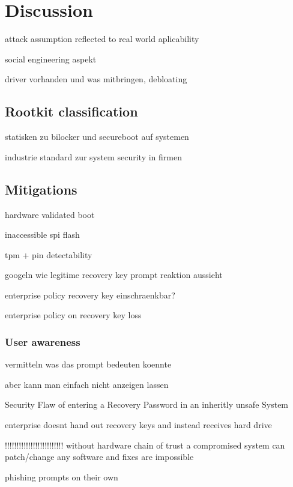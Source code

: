 
\chapter{Discussion}

attack assumption reflected to real world aplicability

social engineering aspekt

driver vorhanden und was mitbringen, debloating

\section{Rootkit classification}

statisken zu bilocker und secureboot auf systemen

industrie standard zur system security in firmen

\section{Mitigations}

hardware validated boot

inaccessible spi flash

tpm + pin detectability

googeln wie legitime recovery key prompt reaktion aussieht

enterprise policy recovery key einschraenkbar?

enterprise policy on recovery key loss


\subsection{User awareness}

vermitteln was das prompt bedeuten koennte

aber kann man einfach nicht anzeigen lassen

Security Flaw of entering a Recovery Password in an inheritly unsafe System

enterprise doesnt hand out recovery keys and instead receives hard drive


!!!!!!!!!!!!!!!!!!!!!!!!!
without hardware chain of trust a compromised system can patch/change any software and fixes are impossible

phishing prompts on their own